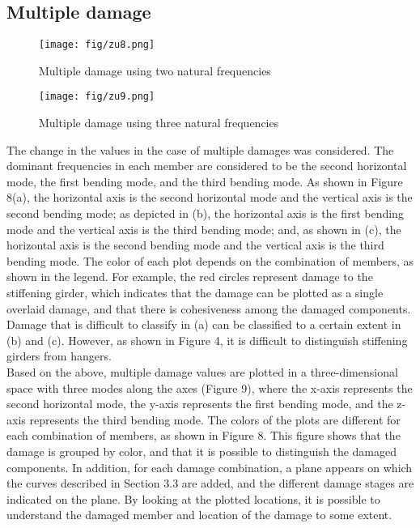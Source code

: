 \documentclass{proc-a4}
\begin{document}
\subsection{Multiple damage}
\begin{figure}
            \centering
            \texttt{[image: fig/zu8.png]}
            \caption{Multiple damage using two natural frequencies}
    \end{figure} 
    \begin{figure}
            \centering
            \texttt{[image: fig/zu9.png]}
            \caption{Multiple damage using three natural frequencies}
    \end{figure} 

The change in the values in the case of multiple damages was considered. The dominant frequencies in each member are considered to be the second horizontal mode, the first bending mode, and the third bending mode. As shown in Figure 8(a), the horizontal axis is the second horizontal mode and the vertical axis is the second bending mode; as depicted in (b), the horizontal axis is the first bending mode and the vertical axis is the third bending mode; and, as shown in (c), the horizontal axis is the second bending mode and the vertical axis is the third bending mode. The color of each plot depends on the combination of members, as shown in the legend. For example, the red circles represent damage to the stiffening girder, which indicates that the damage can be plotted as a single overlaid damage, and that there is cohesiveness among the damaged components. Damage that is difficult to classify in (a) can be classified to a certain extent in (b) and (c). However, as shown in Figure 4, it is difficult to distinguish stiffening girders from hangers.\\
Based on the above, multiple damage values are plotted in a three-dimensional space with three modes along the axes (Figure 9), where the x-axis represents the second horizontal mode, the y-axis represents the first bending mode, and the z-axis represents the third bending mode. The colors of the plots are different for each combination of members, as shown in Figure 8. This figure shows that the damage is grouped by color, and that it is possible to distinguish the damaged components. In addition, for each damage combination, a plane appears on which the curves described in Section 3.3 are added, and the different damage stages are indicated on the plane. By looking at the plotted locations, it is possible to understand the damaged member and location of the damage to some extent.\\
\end{document}
